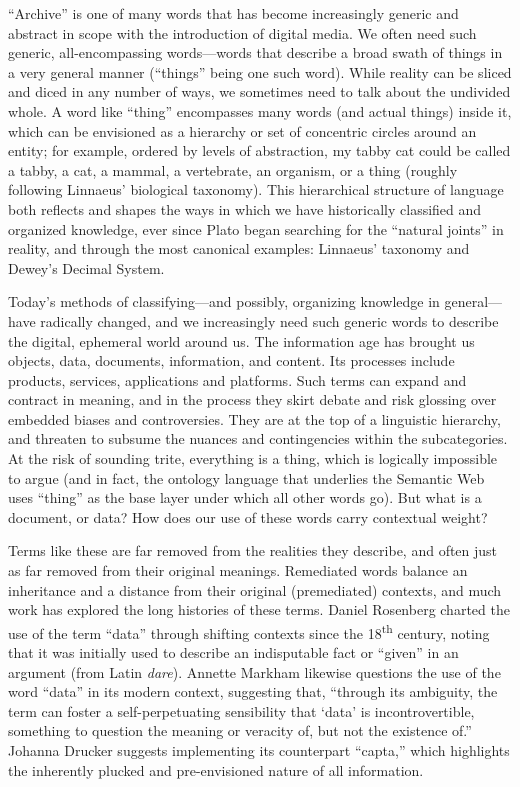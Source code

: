 ``Archive'' is one of many words that has become increasingly generic and abstract in scope with the introduction of digital media. We often need such generic, all-encompassing words---words that describe a broad swath of things in a very general manner (``things'' being one such word). While reality can be sliced and diced in any number of ways, we sometimes need to talk about the undivided whole. A word like ``thing'' encompasses many words (and actual things) inside it, which can be envisioned as a hierarchy or set of concentric circles around an entity; for example, ordered by levels of abstraction, my tabby cat could be called a tabby, a cat, a mammal, a vertebrate, an organism, or a thing (roughly following Linnaeus' biological taxonomy). This hierarchical structure of language both reflects and shapes the ways in which we have historically classified and organized knowledge, ever since Plato began searching for the ``natural joints'' in reality, and through the most canonical examples: Linnaeus' taxonomy and Dewey's Decimal System.

Today's methods of classifying---and possibly, organizing knowledge in general---have radically changed, and we increasingly need such generic words to describe the digital, ephemeral world around us. The information age has brought us objects, data, documents, information, and content. Its processes include products, services, applications and platforms. Such terms can expand and contract in meaning, and in the process they skirt debate and risk glossing over embedded biases and controversies. They are at the top of a linguistic hierarchy, and threaten to subsume the nuances and contingencies within the subcategories. At the risk of sounding trite, everything is a thing, which is logically impossible to argue (and in fact, the ontology language that underlies the Semantic Web uses ``thing'' as the base layer under which all other words go). But what is a document, or data? How does our use of these words carry contextual weight?

Terms like these are far removed from the realities they describe, and often just as far removed from their original meanings. Remediated words balance an inheritance and a distance from their original (premediated) contexts, and much work has explored the long histories of these terms. Daniel Rosenberg charted the use of the term ``data'' through shifting contexts since the 18\textsuperscript{th} century, noting that it was initially used to describe an indisputable fact or ``given'' in an argument (from Latin \emph{dare}).\autocite[15-40]{rosenberg_data_2013}  Annette Markham likewise questions the use of the word ``data'' in its modern context, suggesting that, ``through its ambiguity, the term can foster a self-perpetuating sensibility that `data' is incontrovertible, something to question the meaning or veracity of, but not the existence of.''\autocite{markham_undermining_2013} Johanna Drucker suggests implementing its counterpart ``capta,'' which highlights the inherently plucked and pre-envisioned nature of all information.\autocite{drucker_humanities_2011}

